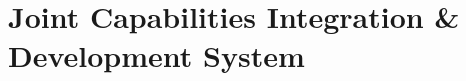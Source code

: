 \documentclass[../main.tex]{subfiles}
\begin{document}
\section{Joint Capabilities Integration \& Development System}

\end{document}
